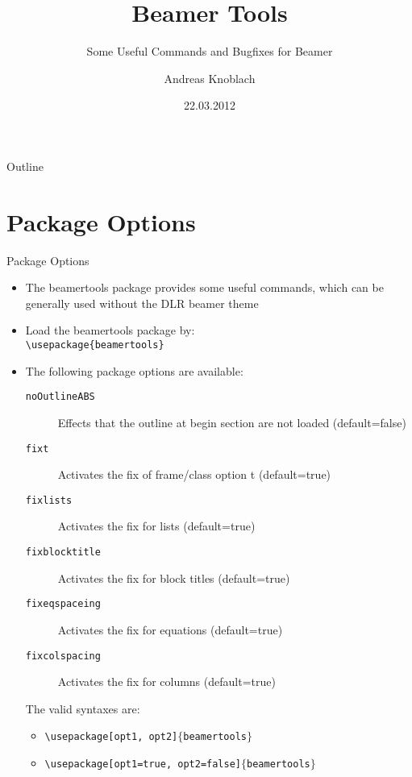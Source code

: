 \documentclass[8pt]{beamer}
\title{Beamer Tools}
\subtitle{Some Useful Commands and Bugfixes for Beamer}
\date{22.03.2012}
\author{Andreas Knoblach}
\begin{document}
\maketitle

\begin{frame}{Outline}
	\tableofcontents
\end{frame}


\OutlineAtBeginSection

\section{Package Options}
\begin{frame}{Package Options}
	\begin{itemize}
		\item The beamertools package provides some useful commands, which can be generally used without the DLR beamer theme
		\item Load the beamertools package by: \\
		      \texttt{\textbackslash usepackage\{beamertools\}}	
		\item The following package options are available:
			\begin{description}
				\item[\texttt{noOutlineABS}]  Effects that the outline at begin section are not loaded (default=false)
				\item[\texttt{fixt}]          Activates the fix of frame/class option t (default=true)
				\item[\texttt{fixlists}]      Activates the fix for lists (default=true)
				\item[\texttt{fixblocktitle}] Activates the fix for block titles (default=true)
				\item[\texttt{fixeqspaceing}] Activates the fix for equations (default=true)
				\item[\texttt{fixcolspacing}] Activates the fix for columns (default=true)
			\end{description}
			
		The valid syntaxes are:
		\begin{itemize}
			\item \texttt{\textbackslash usepackage[opt1, opt2]$\{$beamertools$\}$}
			\item \texttt{\textbackslash usepackage[opt1=true, opt2=false]$\{$beamertools$\}$}
		\end{itemize}
	\end{itemize}
\end{frame}
\end{document}
